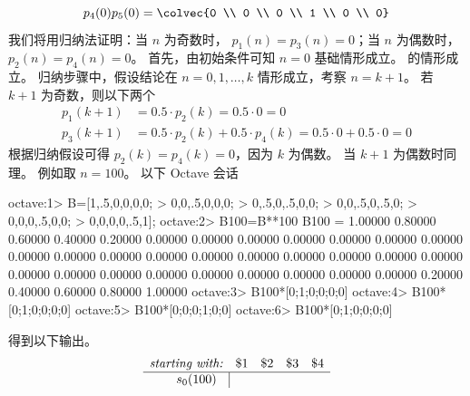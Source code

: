 \begin{exercises}
\begin{answer}
\begin{exparts}
\begin{equation*}
{                        p_{4}(0) \\ p_{5}(0)}
            =
            \colvec{0 \\ 0 \\ 0 \\ 1 \\ 
                        0 \\ 0}
          \end{equation*} 
          我们将用归纳法证明：当 $n$ 为奇数时，
          $p_{1}(n)=p_{3}(n)=0$；当 $n$ 为偶数时，$p_{2}(n)=p_{4}(n)=0$。
          首先，由初始条件可知 $n=0$ 基础情形成立。
          的情形成立。
          归纳步骤中，假设结论在
          $n=0,1,\ldots,k$ 情形成立，考察 $n=k+1$。
          若 $k+1$ 为奇数，则以下两个
          \begin{align*}
             p_{1}(k+1) &= 0.5\cdot p_{2}(k)=0.5\cdot 0=0
                                                          \\
             p_{3}(k+1) &=0.5\cdot p_{2}(k)+0.5\cdot p_{4}(k)
                        =0.5\cdot 0+0.5\cdot 0
                        =0
          \end{align*}
          根据归纳假设可得
          $p_{2}(k)=p_{4}(k)=0$，因为 $k$ 为偶数。
          当 $k+1$ 为偶数时同理。
        \partsitem 例如取 $n=100$。
          以下 Octave 会话
\begin{computercode}
octave:1> B=[1,.5,0,0,0,0;
>             0,0,.5,0,0,0;
>             0,.5,0,.5,0,0;
>             0,0,.5,0,.5,0;
>             0,0,0,.5,0,0;
>             0,0,0,0,.5,1];
octave:2> B100=B**100
B100 =
  1.00000  0.80000  0.60000  0.40000  0.20000  0.00000
  0.00000  0.00000  0.00000  0.00000  0.00000  0.00000
  0.00000  0.00000  0.00000  0.00000  0.00000  0.00000
  0.00000  0.00000  0.00000  0.00000  0.00000  0.00000
  0.00000  0.00000  0.00000  0.00000  0.00000  0.00000
  0.00000  0.20000  0.40000  0.60000  0.80000  1.00000
octave:3> B100*[0;1;0;0;0;0]
octave:4> B100*[0;1;0;0;0;0]
octave:5> B100*[0;0;0;1;0;0]
octave:6> B100*[0;1;0;0;0;0]
\end{computercode}
        得到以下输出。
        \begin{equation*}
          \begin{array}{r|*{4}{c}}
            \multicolumn{1}{r}{\textit{starting with:}}
            &\text{\$1}  &\text{\$2}  &\text{\$3}  &\text{\$4} \\ 
             \hline
               \begin{array}{c}
                 s_{0}(100) \\

\end{array}
\end{array}
\end{equation*}
\end{exparts}
\end{answer}
\end{exercises}
